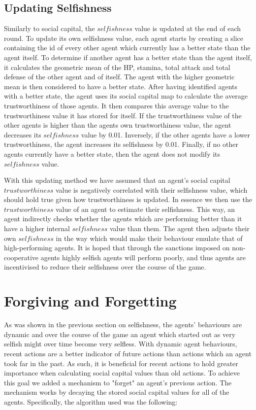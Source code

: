 \subsection{Updating Selfishness}

Similarly to social capital, the $selfishness$ value is updated at the end of each round. To update its own selfishness value, each agent starts by creating a slice containing the id of every other agent which currently has a better state than the agent itself. To determine if another agent has a better state than the agent itself, it calculates the geometric mean of the HP, stamina, total attack and total defense of the other agent and of itself. The agent with the higher geometric mean is then considered to have a better state. After having identified agents with a better state, the agent uses its social capital map to calculate the average trustworthiness of those agents. It then compares this average value to the trustworthiness value it has stored for itself. If the trustworthiness value of the other agents is higher than the agents own trustworthiness value, the agent decreases its $selfishness$ value by 0.01. Inversely, if the other agents have a lower trustworthiness, the agent increases its selfishness by 0.01. Finally, if no other agents currently have a better state, then the agent does not modify its $selfishness$ value.

With this updating method we have assumed that an agent's social capital $trustworthiness$ value is negatively correlated with their selfishness value, which should hold true given how trustworthiness is updated. In essence we then use the $trustworthiness$ value of an agent to estimate their selfishness. This way, an agent indirectly checks whether the agents which are performing better than it have a higher internal $selfishness$ value than them. The agent then adjusts their own $selfishness$ in the way which would make their behaviour emulate that of high-performing agents. It is hoped that through the sanctions imposed on non-cooperative agents highly selfish agents will perform poorly, and thus agents are incentivised to reduce their selfishness over the course of the game.

\section{Forgiving and Forgetting}

As was shown in the previous section on selfishness, the agents' behaviours are dynamic and over the course of the game an agent which started out as very selfish might over time become very selfless. With dynamic agent behaviours, recent actions are a better indicator of future actions than actions which an agent took far in the past. As such, it is beneficial for recent actions to hold greater importance when calculating social capital values than old actions. To achieve this goal we added a mechanism to "forget" an agent's previous action. The mechanism works by decaying the stored social capital values for all of the agents. Specifically, the algorithm used was the following:

